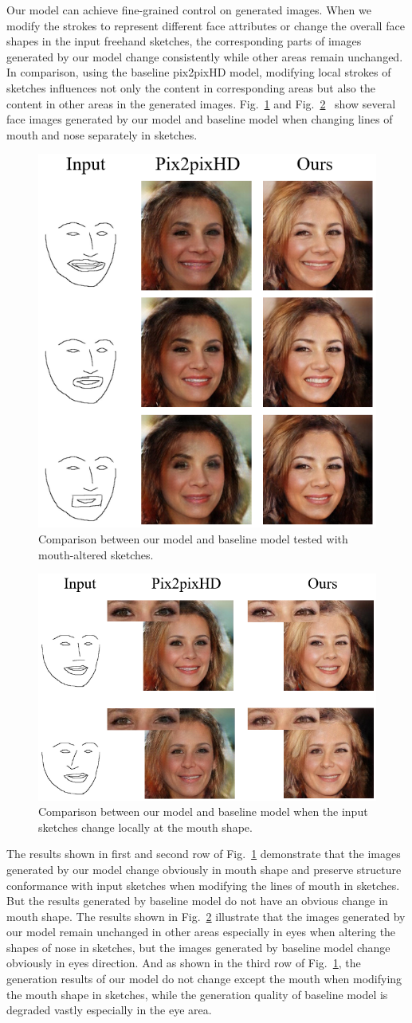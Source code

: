 \documentclass[10pt,twocolumn,letterpaper]{article}
\begin{document}
Our model can achieve fine-grained control on generated images. 
When we modify the strokes to represent different face attributes or change the overall face shapes in the input freehand sketches, the corresponding parts of images generated by our model change consistently while other areas remain unchanged. 
In comparison, using the baseline pix2pixHD model, modifying local strokes of sketches influences not only the content in corresponding areas but also the content in other areas in the generated images. 
Fig.~\ref{fig:compare_2} and Fig.~\ref{fig:compare_3}~ show several face images generated by our model and baseline model when changing lines of mouth and nose separately in sketches.
\begin{figure}[htb]
	\centering
	\includegraphics[width=0.4 \textwidth]{mouth_editing.png}
	\caption{Comparison between our model and baseline model tested with mouth-altered sketches. }
	\label{fig:compare_2}
\end{figure}
\begin{figure}[htb]
	\centering
	\includegraphics[width=0.45 \textwidth]{nose_editing.png}
	\caption{Comparison between our model and baseline model when the input sketches change locally at the mouth shape.}
	\label{fig:compare_3}
\end{figure}
The results shown in first and second row of Fig.~\ref{fig:compare_2} demonstrate that the images generated by our model change obviously in mouth shape and preserve structure conformance with input sketches when modifying the lines of mouth in sketches. 
But the results generated by baseline model do not have an obvious change in mouth shape.
The results shown in Fig.~\ref{fig:compare_3} illustrate that the images generated by our model remain unchanged in other areas especially in eyes when altering the shapes of nose in sketches, but the images generated by baseline model change obviously in eyes direction. 
And as shown in the third row of Fig.~\ref{fig:compare_2}, the generation results of our model do not change except the mouth when modifying the mouth shape in sketches, while the generation quality of baseline model is degraded vastly especially in the eye area. 
\end{document}
